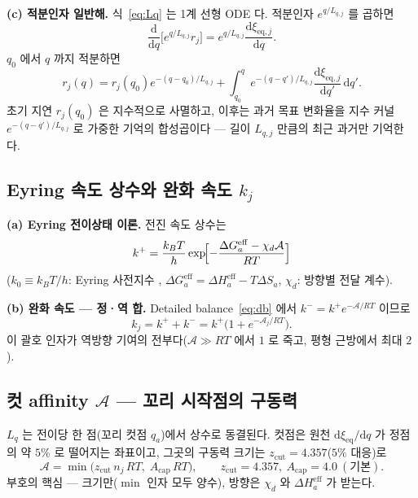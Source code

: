 \documentclass[11pt,a4paper]{article}
\newcommand{\dd}{\mathrm{d}}
\newcommand{\eff}{\mathrm{eff}}
\newcommand{\eq}{\mathrm{eq}}
\begin{document}
\textbf{(c) 적분인자 일반해.} 식~\eqref{eq:Lq} 는 1계 선형 ODE 다. 적분인자 $e^{q/L_{q,j}}$ 를 곱하면
\begin{equation}
\frac{\dd}{\dd q}\bigl[e^{q/L_{q,j}}r_j\bigr] = e^{q/L_{q,j}}\frac{\dd\xi_{\eq,j}}{\dd q}.
\label{eq:ifactor}
\end{equation}
$q_0$ 에서 $q$ 까지 적분하면
\begin{equation}
r_j(q) = r_j(q_0)e^{-(q-q_0)/L_{q,j}}
+ \int_{q_0}^q e^{-(q-q')/L_{q,j}}\frac{\dd\xi_{\eq,j}}{\dd q'}\,\dd q'.
\label{eq:gensol}
\end{equation}
초기 지연 $r_j(q_0)$ 은 지수적으로 사멸하고, 이후는 과거 목표 변화율을 지수 커널
$e^{-(q-q')/L_{q,j}}$ 로 가중한 기억의 합성곱이다 — 길이 $L_{q,j}$ 만큼의 최근 과거만 기억한다.

\subsection{Eyring 속도 상수와 완화 속도 $k_j$}

\textbf{(a) Eyring 전이상태 이론.} 전진 속도 상수는
\begin{equation}
k^+ = \frac{k_BT}{h}\exp\!\Bigl[-\frac{\Delta G_a^\eff - \chi_d\mathcal A}{RT}\Bigr]
\label{eq:eyring}
\end{equation}
($k_0 \equiv k_BT/h$: Eyring 사전지수 \cite{eyring1935},
$\Delta G_a^\eff = \Delta H_a^\eff - T\Delta S_a$, $\chi_d$: 방향별 전달 계수).

\textbf{(b) 완화 속도 — 정·역 합.} Detailed balance~\eqref{eq:db} 에서 $k^- = k^+ e^{-\mathcal A/RT}$ 이므로
\begin{equation}
k_j = k^+ + k^- = k^+\bigl(1+e^{-\mathcal A_j/RT}\bigr).
\label{eq:kuniv}
\end{equation}
이 괄호 인자가 역방향 기여의 전부다($\mathcal A\gg RT$ 에서 $1$ 로 죽고, 평형 근방에서 최대 $2$).

\subsection{컷 affinity $\mathcal A$ — 꼬리 시작점의 구동력}
$L_q$ 는 전이당 한 점(꼬리 컷점 $q_a$)에서 상수로 동결된다. 컷점은 원천 $\dd\xi_\eq/\dd q$ 가
정점의 약 $5\%$ 로 떨어지는 좌표이고, 그곳의 구동력 크기는 $z_\mathrm{cut}=4.357$($5\%$ 대응)로
\begin{equation}
\mathcal A=\min\!\big(z_\mathrm{cut}\,n_j\,RT,\;A_\mathrm{cap}\,RT\big),
\qquad z_\mathrm{cut}=4.357,\ A_\mathrm{cap}=4.0\ (\text{기본}).
\label{eq:Acut}
\end{equation}
부호의 핵심 — 크기만($\min$ 인자 모두 양수), 방향은 $\chi_d$ 와 $\Delta H_a^\eff$ 가 받는다.
\end{document}
